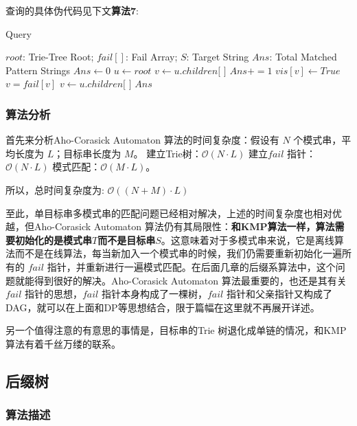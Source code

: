 \documentclass[UTF8]{ctexart}
\begin{document}
查询的具体伪代码见下文\textbf{算法7}:

\begin{algorithm}
\caption{Query}  
\label{alg: Aho-Corasick Automaton Query} 
\begin{algorithmic} [1] 
	\Require $root$: Trie-Tree Root; $fail[]$: Fail Array; $S$: Target String
	\Ensure $Ans$: Total Matched Pattern Strings
		\State $Ans \gets 0$
		\State $u \gets root$
			\State $v \gets u.children[$  $]$
				\State $Ans += 1$
				\State $vis[v] \gets True$
				\State $v = fail[v]$
			\EndWhile
			\State $v \gets u.children[$  $]$
		\EndFor
		\State \Return $Ans$
	\EndFunction  
\end{algorithmic}
\end{algorithm}

\subsubsection {算法分析}

首先来分析Aho-Corasick Automaton 算法的时间复杂度：假设有 $N$ 个模式串，平均长度为 $L$；目标串长度为 $M$。 建立Trie树：$\mathcal{O}(N \cdot L)$ 建立$fail$ 指针：$\mathcal{O}(N \cdot L)$ 模式匹配：$\mathcal{O}(M \cdot L)$。\par
所以，总时间复杂度为: $\mathcal{O}((N+M) \cdot L)$

至此，单目标串多模式串的匹配问题已经相对解决，上述的时间复杂度也相对优越，但Aho-Corasick Automaton 算法仍有其局限性：\textbf{和KMP算法一样，算法需要初始化的是模式串$T$而不是目标串$S$}。这意味着对于多模式串来说，它是离线算法而不是在线算法，每当新加入一个模式串的时候，我们仍需要重新初始化一遍所有的 $fail$ 指针，并重新进行一遍模式匹配。在后面几章的后缀系算法中，这个问题就能得到很好的解决。Aho-Corasick Automaton 算法最重要的，也还是其有关 $fail$ 指针的思想，$fail$ 指针本身构成了一棵树，$fail$ 指针和父亲指针又构成了 DAG，就可以在上面和DP等思想结合，限于篇幅在这里就不再展开详述。

另一个值得注意的有意思的事情是，目标串的Trie 树退化成单链的情况，和KMP算法有着千丝万缕的联系。

\subsection {后缀树}

\subsubsection {算法描述}
\end{document}
